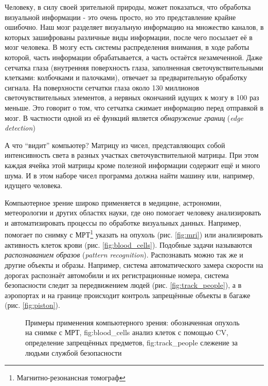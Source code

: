 \documentclass[12pt]{report}
\begin{document}
Человеку, в силу своей зрительной природы, может показаться, что обработка визуальной информации - это очень 
просто, 
но это представление крайне ошибочно. Наш мозг разделяет визуальную информацию на множество каналов, в которых 
зашифрованы различные виды информации, после чего посылает её в мозг человека. В мозгу есть системы распределения 
внимания, в 
ходе работы которой, часть информации обрабатывается, а часть остаётся незамеченной. \citep{bradski2008learning} 
Даже 
сетчатка глаза (внутренняя поверхность глаза, заполненная светочувствительными клетками: колбочками и палочками), 
отвечает за предварительную обработку сигнала. На поверхности сетчатки глаза около 130 миллионов 
светочувствительных 
элементов, а нервных окончаний идущих к мозгу в 100 раз меньше. Это говорит о том, что сетчатка сжимает информацию 
перед отправкой в мозг. В 
частности одной из её функций является \emph{обнаружение границ} (\textit{edge detection}) \citep{RetinaOnWiki}

А что ``видит'' компьютер? Матрицу из чисел, представляющих собой интенсивность света в разных участках 
светочувствительной матрицы. При этом каждая ячейка этой матрицы кроме полезной информации содержит ещё и много 
шума. И в 
этом наборе чисел программа должна найти машину или, например, идущего человека.

Компьютерное зрение широко применяется в медицине, астрономии, метеорологии и других областях науки, где оно 
помогает человеку анализировать и автоматизировать процессы по обработке визуальных данных. 
Например, помогает по снимку с МРТ\footnote{Магнитно-резонансная томограф} указать на опухоль (рис. \ref{fig:mri}) 
или 
анализировать активность клеток крови (рис. \ref{fig:blood_cells}). Подобные задачи называются \emph{распознаванием 
образов} 
(\textit{pattern recognition}). Распознавать можно так же и другие объекты и образы. Например, система 
автоматического 
замера скорости на дорогах распознаёт автомобили и их регистрационные номера, система безопасности следит за
передвижением людей (рис. \ref{fig:track_people}), а в аэропортах и на границе происходит контроль запрещённые 
объекты в багаже (рис. \ref{fig:piston}).

\begin{figure}[h]
	\centering
		
	\caption{Примеры применения компьютерного зрения:  обозначенная опухоль на снимке с МРТ, 
\subref
{fig:blood_cells} анализ клеток с помощью CV,  определение запрещённых предметов, \subref
{fig:track_people} слежение за людьми службой безопасности}
	\label{fig:cv_usage}
\end{figure}
\end{document}
